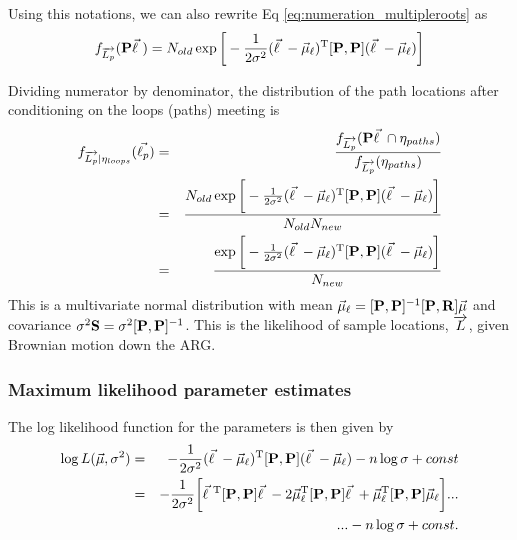 Using this notations, we can also rewrite Eq \ref{eq:numeration_multipleroots} as 
\begin{eqnarray}
    f_{\overrightarrow{L_p}}(\mathbf{P} \vec{\ell} \ ) = N_{old} \exp\bigg[-\frac{1}{2\sigma^2}(\vec{\ell} \  - \vec{\mu}_\ell)^{\text{T}} [\mathbf{P},\mathbf{P}] (\vec{\ell} \  - \vec{\mu}_\ell)\bigg]  
\end{eqnarray}

Dividing numerator by denominator, the distribution of the path locations after conditioning on the loops (paths) meeting is
\begin{eqnarray}
    f_{\overrightarrow{L_p}|\eta_{loops}}(\vec{\ell_p})
    &=& \frac{f_{\overrightarrow{L_p}}(\mathbf{P} \vec{\ell} \  \cap \eta_{paths})}{f_{\overrightarrow{L_p}}(\eta_{paths})} \\
    &=& \frac{N_{old} \exp\bigg[-\frac{1}{2\sigma^2}(\vec{\ell} \  - \vec{\mu}_\ell)^{\text{T}} [\mathbf{P},\mathbf{P}] (\vec{\ell} \  - \vec{\mu}_\ell)\bigg]  }{N_{old}N_{new}} \\
    &=& \frac{ \exp\bigg[-\frac{1}{2\sigma^2}(\vec{\ell} \  - \vec{\mu}_\ell)^{\text{T}} [\mathbf{P},\mathbf{P}] (\vec{\ell} \  - \vec{\mu}_\ell)\bigg]  }{N_{new}}
\end{eqnarray}
This is a multivariate normal distribution with mean $\vec{\mu}_\ell = [\mathbf{P},\mathbf{P}]^{-1}[\mathbf{P},\mathbf{R}]\vec{\mu}$ and covariance  $\sigma^2 \mathbf{S} = \sigma^2 [\mathbf{P},\mathbf{P}]^{-1}$. This is the likelihood of sample locations, $\overrightarrow{L}$, given Brownian motion down the ARG.

\subsubsection{Maximum likelihood parameter estimates}
The log likelihood function for the parameters is then given by 
\begin{eqnarray}
    \log L(\vec{\mu},\sigma^2) &=& -\frac{1}{2\sigma^2}(\vec{\ell} \  - \vec{\mu}_\ell)^{\text{T}} [\mathbf{P},\mathbf{P}] (\vec{\ell} \  - \vec{\mu}_\ell) - n\log\sigma + const \\
    &=& -\frac{1}{2\sigma^2} \bigg[ \vec{\ell} \ ^{\text{T}} [\mathbf{P},\mathbf{P}] \vec{\ell} \  - 2 \vec{\mu}_\ell^{\text{T}} [\mathbf{P}, \mathbf{P}] \vec{\ell} \  + \vec{\mu}_\ell^{\text{T}} [\mathbf{P},\mathbf{P}] \vec{\mu}_\ell \bigg] ... \\
    && ... -n\log \sigma + const. 
\end{eqnarray}

